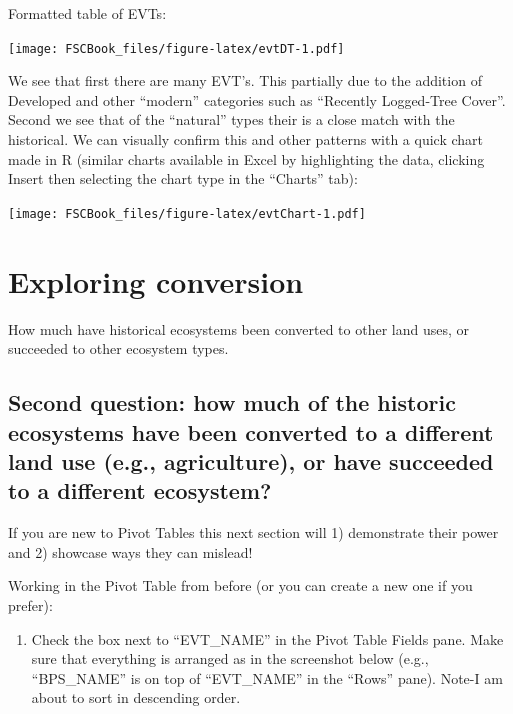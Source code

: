 \documentclass[
]{book}
\providecommand{\tightlist}{%
  \setlength{\itemsep}{0pt}\setlength{\parskip}{0pt}}
\begin{document}
Formatted table of EVTs:

\texttt{[image: FSCBook\_files/figure-latex/evtDT-1.pdf]}

We see that first there are many EVT's. This partially due to the addition of Developed and other ``modern'' categories such as ``Recently Logged-Tree Cover''. Second we see that of the ``natural'' types their is a close match with the historical. We can visually confirm this and other patterns with a quick chart made in R (similar charts available in Excel by highlighting the data, clicking Insert then selecting the chart type in the ``Charts'' tab):

\texttt{[image: FSCBook\_files/figure-latex/evtChart-1.pdf]}

\hypertarget{conversion}{%
\chapter{Exploring conversion}\label{conversion}}

How much have historical ecosystems been converted to other land uses, or succeeded to other ecosystem types.

\hypertarget{second-question-how-much-of-the-historic-ecosystems-have-been-converted-to-a-different-land-use-e.g.-agriculture-or-have-succeeded-to-a-different-ecosystem}{%
\section{Second question: how much of the historic ecosystems have been converted to a different land use (e.g., agriculture), or have succeeded to a different ecosystem?}\label{second-question-how-much-of-the-historic-ecosystems-have-been-converted-to-a-different-land-use-e.g.-agriculture-or-have-succeeded-to-a-different-ecosystem}}

If you are new to Pivot Tables this next section will 1) demonstrate their power and 2) showcase ways they can mislead!

Working in the Pivot Table from before (or you can create a new one if you prefer):

\begin{enumerate}
\def\labelenumi{\arabic{enumi}.}
\tightlist
\item
  Check the box next to ``EVT\_NAME'' in the Pivot Table Fields pane. Make sure that everything is arranged as in the screenshot below (e.g., ``BPS\_NAME'' is on top of ``EVT\_NAME'' in the ``Rows'' pane). Note-I am about to sort in descending order.
\end{enumerate}
\end{document}
